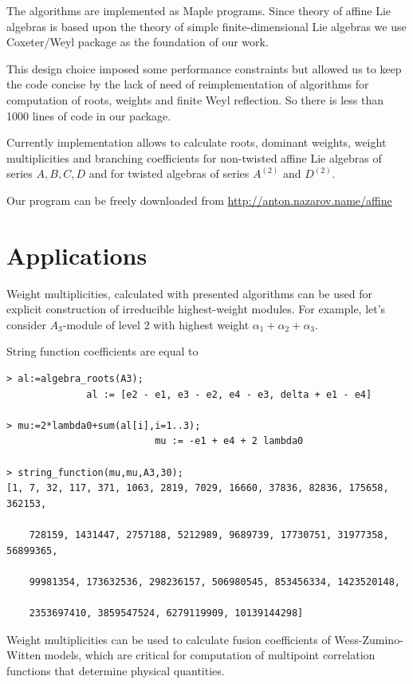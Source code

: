 \documentclass[a4paper,12pt]{article}
\theoremstyle{definition} \newtheorem{Def}{Definition}
\begin{document}
The algorithms are implemented as Maple programs. Since theory of
affine Lie algebras is based upon the theory of simple
finite-dimensional Lie algebras we use Coxeter/Weyl package
\cite{stembridge1995mps} as the foundation of our work.

This design choice imposed some performance constraints but allowed us
to keep the code concise by the lack of need of reimplementation of
algorithms for computation of roots, weights and finite Weyl
reflection. So there is less than 1000 lines of code in our package.

Currently implementation allows to calculate roots, dominant weights,
weight multiplicities and branching coefficients for non-twisted
affine Lie algebras of series $A,B,C,D$ and for twisted algebras of
series $A^{(2)}$ and $D^{(2)}$.

Our program can be freely downloaded from \url{http://anton.nazarov.name/affine}

\section{Applications}
\label{sec:applications}

Weight multiplicities, calculated with presented algorithms can be
used for explicit construction of irreducible highest-weight modules.
For example, let's consider $A_3$-module of level 2 with highest
weight $\alpha_1+\alpha_2+\alpha_3$. 

String function coefficients are equal to
\begin{verbatim}
> al:=algebra_roots(A3);
              al := [e2 - e1, e3 - e2, e4 - e3, delta + e1 - e4]

> mu:=2*lambda0+sum(al[i],i=1..3);
                          mu := -e1 + e4 + 2 lambda0

> string_function(mu,mu,A3,30);
[1, 7, 32, 117, 371, 1063, 2819, 7029, 16660, 37836, 82836, 175658, 362153,

    728159, 1431447, 2757188, 5212989, 9689739, 17730751, 31977358, 56899365,

    99981354, 173632536, 298236157, 506980545, 853456334, 1423520148,

    2353697410, 3859547524, 6279119909, 10139144298]
\end{verbatim}

Weight multiplicities can be used to calculate fusion coefficients of
Wess-Zumino-Witten models, which are critical for computation of
multipoint correlation functions that determine physical quantities. 
\end{document}
